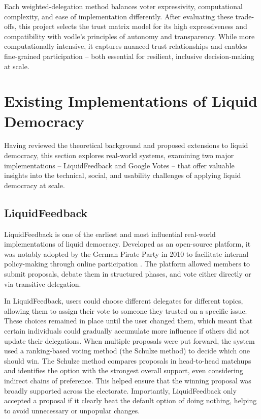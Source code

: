 Each weighted-delegation method balances voter expressivity, computational complexity, and ease of implementation differently. After evaluating these trade-offs, this project selects the trust matrix model for its high expressiveness and compatibility with vodle's principles of autonomy and transparency. While more computationally intensive, it captures nuanced trust relationships and enables fine-grained participation -- both essential for resilient, inclusive decision-making at scale.

\section{Existing Implementations of Liquid Democracy}
Having reviewed the theoretical background and proposed extensions to liquid democracy, this section explores real-world systems, examining two major implementations -- LiquidFeedback and Google Votes -- that offer valuable insights into the technical, social, and usability challenges of applying liquid democracy at scale.

\subsection{LiquidFeedback}
LiquidFeedback is one of the earliest and most influential real-world implementations of liquid democracy. Developed as an open-source platform, it was notably adopted by the German Pirate Party in 2010 to facilitate internal policy-making through online participation \citep{behrens_liquidfeedback_2014}. The platform allowed members to submit proposals, debate them in structured phases, and vote either directly or via transitive delegation.

In LiquidFeedback, users could choose different delegates for different topics, allowing them to assign their vote to someone they trusted on a specific issue. These choices remained in place until the user changed them, which meant that certain individuals could gradually accumulate more influence if others did not update their delegations. When multiple proposals were put forward, the system used a ranking-based voting method (the Schulze method) to decide which one should win. The Schulze method compares proposals in head-to-head matchups and identifies the option with the strongest overall support, even considering indirect chains of preference. This helped ensure that the winning proposal was broadly supported across the electorate. Importantly, LiquidFeedback only accepted a proposal if it clearly beat the default option of doing nothing, helping to avoid unnecessary or unpopular changes.



